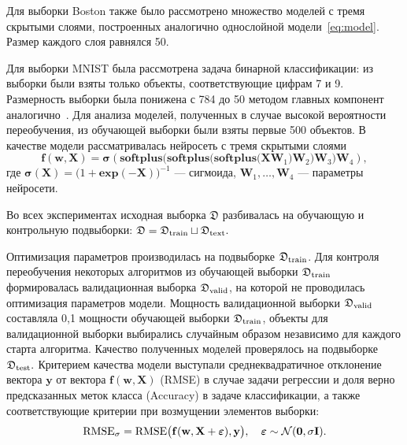 {Для выборки Boston также было рассмотрено множество моделей с тремя скрытыми слоями, построенных аналогично однослойной модели~\eqref{eq:model}. Размер каждого слоя равнялся 50.}

{Для выборки MNIST была рассмотрена задача бинарной классификации: из выборки были взяты только объекты, соответствующие цифрам 7 и 9. Размерность выборки была понижена с 784 до 50 методом главных компонент аналогично~\cite{firefly}. Для анализа моделей, полученных в случае высокой вероятности переобучения, из обучающей выборки были взяты первые 500 объектов. В качестве модели рассматривалась нейросеть с тремя скрытыми слоями}
\[
    \mathbf{f}(\mathbf{w}, \mathbf{X}) =   \boldsymbol{\sigma}(\textbf{softplus}\bigl(  \textbf{softplus} \bigl(\textbf{softplus}\bigl(\mathbf{X} \mathbf{W}_1 \bigr)  \mathbf{W}_2 \bigr) \mathbf{W}_3 \bigr) \mathbf{W}_4),
\]
{где $\boldsymbol{\sigma}(\mathbf{X}) = \bigl(1+\textbf{exp}(\mathbf{-X})\bigr)^{-1}$  --- сигмоида, $\mathbf{W}_1, \dots, \mathbf{W}_4$ --- параметры нейросети.}



Во всех экспериментах исходная выборка $\mathfrak{D}$ разбивалась на обучающую и контрольную подвыборки:
$
	\mathfrak{D} = \mathfrak{D}_\textnormal{train} \sqcup \mathfrak{D}_\textnormal{text}.
$

Оптимизация параметров производилась на подвыборке $\mathfrak{D}_\textnormal{train}$. Для контроля переобучения некоторых алгоритмов из обучающей выборки $\mathfrak{D}_\textnormal{train}$ формировалась валидационная выборка $\mathfrak{D}_\textnormal{valid}$, на которой не проводилась оптимизация параметров  модели. Мощность валидационной выборки $\mathfrak{D}_\textnormal{valid}$ составляла 0,1 мощности обучающей выборки  $\mathfrak{D}_\textnormal{train}$, объекты для валидационной выборки выбирались случайным образом независимо для каждого старта алгоритма.
Качество полученных моделей проверялось на подвыборке $\mathfrak{D}_\textnormal{test}.$ Критерием качества модели выступали среднеквадратичное отклонение вектора $\mathbf{y}$ от вектора $\mathbf{f}(\mathbf{w}, \mathbf{X})$ (RMSE) {в случае задачи регрессии и доля верно предсказанных меток класса (Accuracy) в задаче классификации}, а также { соответствующие критерии } при возмущении элементов выборки:
\begin{equation}
\label{eq:rmse}
	\textnormal{RMSE}_{\sigma} =\textnormal{RMSE}\bigl(\mathbf{f}( \mathbf{w}, \mathbf{X}+\boldsymbol{\varepsilon}), \mathbf{y}\bigr),  \quad \boldsymbol{\varepsilon} \sim \mathcal{N}(\mathbf{0}, \sigma \mathbf{I}).
\end{equation}

